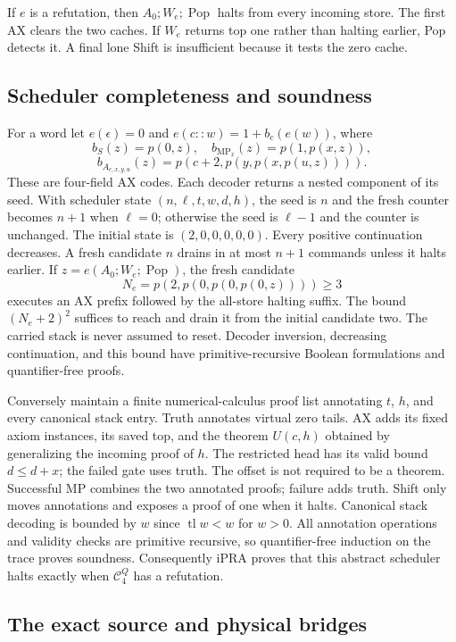 If $e$ is a refutation, then $A_0;W_e;\operatorname{Pop}$ halts
from every incoming store.  The first AX clears the two caches.
If $W_e$ returns top one rather than halting earlier, Pop detects it.
A final lone Shift is insufficient because it tests the zero cache.

\subsection{Scheduler completeness and soundness}

For a word let $e(\epsilon)=0$ and $e(c::w)=1+b_c(e(w))$, where
\[
 b_S(z)=p(0,z),\quad b_{\operatorname{MP}_x}(z)=p(1,p(x,z)),
\]
\[
 b_{A_{c,x,y,u}}(z)=p(c+2,p(y,p(x,p(u,z)))).
\]
These are four-field AX codes.  Each decoder returns a nested component
of its seed.  With scheduler state $(n,\ell,t,w,d,h)$, the seed is
$n$ and the fresh counter becomes $n+1$ when $\ell=0$; otherwise
the seed is $\ell-1$ and the counter is unchanged.  The initial
state is $(2,0,0,0,0,0)$.
Every positive continuation decreases.  A fresh candidate $n$ drains
in at most $n+1$ commands unless it halts earlier.
If $z=e(A_0;W_e;\operatorname{Pop})$, the fresh candidate
\[
 N_e=p(2,p(0,p(0,p(0,z))))\ge3
\]
executes an AX prefix followed by the all-store halting suffix.
The bound $(N_e+2)^2$ suffices to reach and drain it from the initial
candidate two.  The carried stack is never assumed to reset.
Decoder inversion, decreasing continuation, and this bound have
primitive-recursive Boolean formulations and quantifier-free proofs.

Conversely maintain a finite numerical-calculus proof list annotating
$t$, $h$, and every canonical stack entry.  Truth annotates virtual zero
tails.  AX adds its fixed axiom instances, its saved top, and the theorem
$U(c,h)$ obtained by generalizing the incoming proof of $h$.
The restricted head has its valid bound $d\le d+x$; the failed gate
uses truth.  The offset is not required to be a theorem.
Successful MP combines the two annotated proofs; failure adds truth.
Shift only moves annotations and exposes a proof of one when it halts.
Canonical stack decoding is bounded by $w$ since $\operatorname{tl}w<w$
for $w>0$.  All annotation operations and validity checks are primitive
recursive, so quantifier-free induction on the trace proves soundness.
Consequently iPRA proves that this abstract scheduler halts exactly
when $\mathcal C_4^Q$ has a refutation.

\subsection{The exact source and physical bridges}

